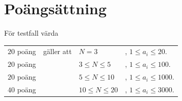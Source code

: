 \section*{Poängsättning}

För testfall värda 
\begin{tabular}{llll}
$20$ poäng & gäller att &$N=3$ & , $1 \le a_i \le 20$. \\
$20$ poäng &  & $3\le N\le 5$ & , $1 \le a_i \le 100$.\\
$20$ poäng &  & $5\le N\le 10$ & , $1 \le a_i \le 1000$. \\
$40$ poäng &  & $10\le N\le 20$ &, $1 \le a_i \le 3000$. \\
\end{tabular} 
